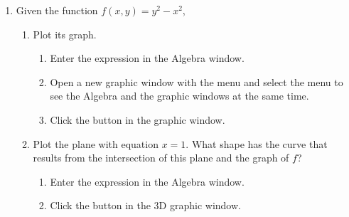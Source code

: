 \begin{enumerate}[leftmargin=*]
\item Given the function $f(x,y)=y^2-x^2$,
\begin{enumerate}
\item Plot its graph.
\begin{indication}
\begin{enumerate}
\item Enter the expression  in the Algebra window.
\item Open a new graphic window with the menu  and select the menu  to see the Algebra and the graphic windows at the same time.
\item Click the button  in the graphic window.
\end{enumerate}
\end{indication}


\item Plot the plane with equation $x=1$. 
What shape has the curve that results from the intersection of this plane and the graph of $f$?
\begin{indication}
\begin{enumerate}
\item Enter the expression  in the Algebra window.
\item Click the button  in the 3D graphic window.
\end{enumerate}
\end{indication}


\end{enumerate}
\end{enumerate}
